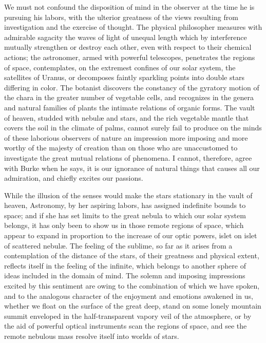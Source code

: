 We must not confound the disposition of mind in the observer at the time he is pursuing his labors, with the ulterior greatness of the views resulting from investigation and the exercise of thought. The physical philosopher measures with admirable sagacity the waves of light of unequal length which by interference mutually strengthen or destroy each other, even with respect to their chemical actions; the astronomer, armed with powerful telescopes, penetrates the regions of space, contemplates, on the extremest confines of our solar system, the satellites of Uranus, or decomposes faintly sparkling points into double stars differing in color. The botanist discovers the constancy of the gyratory motion of the chara in the greater number of vegetable cells, and recognizes in the genera and natural families of plants the intimate relations of organic forms. The vault of heaven, studded with nebulæ and stars, and the rich vegetable mantle that covers the soil in the climate of palms, cannot surely fail to produce on the minds of these laborious observers of nature an impression more imposing and more worthy of the majesty of creation than on those who are unaccustomed to investigate the great mutual relations of phenomena. I cannot, therefore, agree with Burke when he says, it is our ignorance of natural things that causes all our admiration, and chiefly excites our passions.

While the illusion of the senses would make the stars stationary in the vault of heaven, Astronomy, by her aspiring labors, has assigned indefinite bounds to space; and if she has set limits to the great nebula to which our solar system belongs, it has only been to show us in those remote regions of space, which appear to expand in proportion to the increase of our optic powers, islet on islet of scattered nebul\ae. The feeling of the sublime, so far as it arises from a contemplation of the distance of the stars, of their greatness and physical extent, reflects itself in the feeling of the infinite, which belongs to another sphere of ideas included in the domain of mind. The solemn and imposing impressions excited by this sentiment are owing to the combination of which we have spoken, and to the analogous character of the enjoyment and emotions awakened in us, whether we float on the surface of the great deep, stand on some lonely mountain summit enveloped in the half-transparent vapory veil of the atmosphere, or by the aid of powerful optical instruments scan the regions of space, and see the remote nebulous mass resolve itself into worlds of stars.

